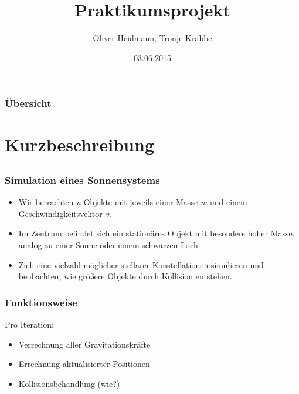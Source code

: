 \documentclass{beamer}
\title[PAPO 2015]{Praktikumsprojekt}
\author{Oliver Heidmann, Tronje Krabbe}
\institute[UHH]
{
Uni Hamburg \\
Praktikum Parallele Programmierung\\
}
\date{03.06.2015}
\begin{document}
\begin{frame}
\titlepage
\end{frame}

\begin{frame}
\frametitle{Übersicht}
\tableofcontents
\end{frame}



\section{Kurzbeschreibung}

\subsection{}


\begin{frame}
    \frametitle{Simulation eines Sonnensystems}
    \begin{itemize}
        \item Wir betrachten \textit{n} Objekte
            mit jeweils einer Masse \textit{m}
            und einem Geschwindigkeitsvektor \textit{v}.
        \item Im Zentrum befindet sich ein stationäres Objekt
            mit besonders hoher Masse, analog zu einer Sonne
            oder einem schwarzen Loch.
        \item Ziel: eine vielzahl möglicher stellarer
            Konstellationen simulieren und beobachten,
            wie größere Objekte durch Kollision entstehen.
    \end{itemize}
\end{frame}


\begin{frame}
    \frametitle{Funktionsweise}
    Pro Iteration:
    \begin{itemize}
        \item Verrechnung aller Gravitationskräfte
        \item Errechnung aktualisierter Positionen
        \item Kollisionsbehandlung (wie?)
    \end{itemize}
\end{frame}
\end{document}
